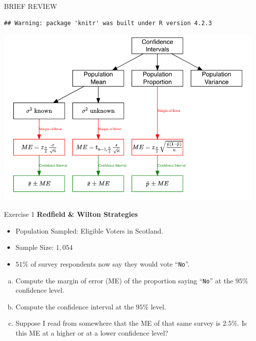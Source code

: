 \documentclass[
  11pt,
  ignorenonframetext,
]{beamer}
\providecommand{\tightlist}{%
  \setlength{\itemsep}{0pt}\setlength{\parskip}{0pt}}
\begin{document}
\begin{frame}[fragile]{BRIEF REVIEW}
\begin{verbatim}
## Warning: package 'knitr' was built under R version 4.2.3
\end{verbatim}

\begin{center}\includegraphics[width=0.9\linewidth]{pictures/CI_BriefReview} \end{center}
\end{frame}

\begin{frame}[fragile]{Exercise 1}
\protect\hypertarget{exercise-1}{}
\textbf{Redfield \& Wilton Strategies}

\begin{itemize}
\tightlist
\item
  Population Sampled: Eligible Voters in Scotland.
\item
  Sample Size: \(1,054\)
\item
  \(51\%\) of survey respondents now say they would vote
  ``\texttt{No}''.
\end{itemize}

\begin{enumerate}
[(a)]
\tightlist
\item
  Compute the margin of error (ME) of the proportion saying
  ``\texttt{No}'' at the \(95\%\) confidence level.
\item
  Compute the confidence interval at the \(95\%\) level.
\item
  Suppose I read from somewhere that the ME of that same survey is
  \(2.5\%\). Is this ME at a higher or at a lower confidence level?
\end{enumerate}
\end{frame}
\end{document}
